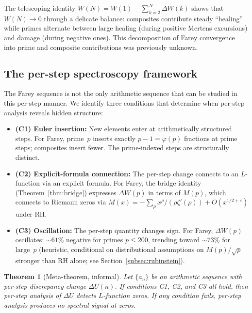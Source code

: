 \documentclass[11pt]{article}
\newtheorem{theorem}{Theorem}[section]
\theoremstyle{definition}
\begin{document}
The telescoping identity $W(N) = W(1) - \sum_{k=2}^{N}\Delta W(k)$
shows that $W(N) \to 0$ through a delicate balance: composites
contribute steady ``healing'' while primes alternate between large
healing (during positive Mertens excursions) and damage (during
negative ones).  This decomposition of Farey convergence into
prime and composite contributions was previously unknown.

\subsection{The per-step spectroscopy framework}
\label{subsec:framework}

The Farey sequence is not the only arithmetic sequence that can be
studied in this per-step manner.  We identify three conditions that
determine when per-step analysis reveals hidden structure:

\begin{itemize}
\item \textbf{(C1) Euler insertion:} New elements enter at
  arithmetically structured steps.  For Farey, prime~$p$ inserts
  exactly $p-1 = \varphi(p)$ fractions at prime steps; composites
  insert fewer.  The prime-indexed steps are structurally distinct.

\item \textbf{(C2) Explicit-formula connection:} The per-step change
  connects to an $L$-function via an explicit formula.  For Farey,
  the bridge identity (Theorem~\ref{thm:bridge}) expresses
  $\Delta W(p)$ in terms of $M(p)$, which connects to Riemann zeros
  via $M(x) = -\sum_\rho x^\rho/(\rho\zeta'(\rho)) + O(x^{1/2+\varepsilon})$ under RH.

\item \textbf{(C3) Oscillation:} The per-step quantity changes sign.
  For Farey, $\Delta W(p)$ oscillates: $\sim 61\%$ negative for
  primes $p \le 200$, trending toward $\sim 73\%$ for large~$p$
  (heuristic, conditional on distributional assumptions on $M(p)/\sqrt{p}$
  stronger than RH alone; see Section~\ref{subsec:rubinstein}).
\end{itemize}

\begin{theorem}[Meta-theorem, informal]
\label{thm:meta}
Let $\{a_n\}$ be an arithmetic sequence with per-step discrepancy
change $\Delta U(n)$.  If conditions \emph{C1}, \emph{C2}, and
\emph{C3} all hold, then per-step analysis of $\Delta U$ detects
$L$-function zeros.  If any condition fails, per-step analysis
produces no spectral signal at zeros.
\end{theorem}
\end{document}
